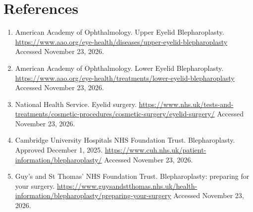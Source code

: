 \section*{References}
\begin{enumerate}
  \item American Academy of Ophthalmology. Upper Eyelid Blepharoplasty. \url{https://www.aao.org/eye-health/diseases/upper-eyelid-blepharoplasty} Accessed November 23, 2026.
  \item American Academy of Ophthalmology. Lower Eyelid Blepharoplasty. \url{https://www.aao.org/eye-health/treatments/lower-eyelid-blepharoplasty} Accessed November 23, 2026.
  \item National Health Service. Eyelid surgery. \url{https://www.nhs.uk/tests-and-treatments/cosmetic-procedures/cosmetic-surgery/eyelid-surgery/} Accessed November 23, 2026.
  \item Cambridge University Hospitals NHS Foundation Trust. Blepharoplasty. Approved December 1, 2025. \url{https://www.cuh.nhs.uk/patient-information/blepharoplasty/} Accessed November 23, 2026.
  \item Guy's and St Thomas' NHS Foundation Trust. Blepharoplasty: preparing for your surgery. \url{https://www.guysandstthomas.nhs.uk/health-information/blepharoplasty/preparing-your-surgery} Accessed November 23, 2026.
\end{enumerate}

\clearpage
